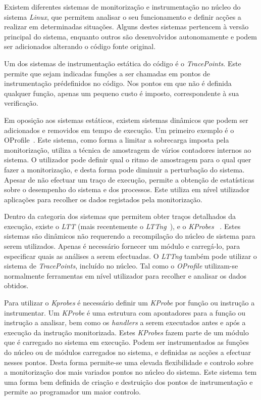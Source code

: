 \documentclass[a4paper]{llncs}
\newcommand{\td}[1]{\todo[inline]{#1}}
\begin{document}
Existem diferentes sistemas de monitorização e instrumentação no núcleo do sistema \textit{Linux}, que permitem analisar o seu funcionamento e definir acções a realizar em determinadas situações.
 Alguns destes sistemas pertencem à versão principal do sistema, enquanto outros são desenvolvidos autonomamente e podem ser adicionados alterando o código fonte original. 

Um dos sistemas de instrumentação estática do código é o \textit{TracePoints}. Este permite que sejam indicadas funções a ser chamadas em pontos de instrumentação prédefinidos no código. Nos pontos em que não é definida qualquer função, apenas um pequeno custo é imposto, correspondente à sua verificação. 

Em oposição aos sistemas estáticos, existem sistemas dinâmicos que podem  ser adicionados e removidos em tempo de execução. Um primeiro exemplo é o OProfile~\cite{oprofile}. 
Este sistema, como forma a limitar a sobrecarga imposta pela monitorização, utiliza a técnica de amostragem de vários contadores internos ao sistema. O utilizador pode definir qual o ritmo de amostragem para o qual quer fazer a monitorização, e desta forma pode diminuir a perturbação do sistema.
 Apesar de não efectuar um traço de execução, permite a obtenção de estatísticas sobre o desempenho do sistema e dos processos.
 Este utiliza em nível utilizador aplicações para recolher os dados registados pela monitorização.

Dentro da categoria dos sistemas que permitem obter traços detalhados da execução, existe o \textit{LTT} (mais recentemente o \textit{LTTng}~\cite{Mathieu2009}), e o \textit{KProbes} ~\cite{kernel_debug_printk_on_fly}. %
Estes sistemas são dinâmicos não requerendo a recompilação do núcleo de sistema para serem utilizados. Apenas é necessário fornecer um módulo  e carregá-lo, para  especificar quais as análises a serem efectuadas. O \textit{LTTng} também pode utilizar o sistema de \textit{TracePoints}, incluído no núcleo. Tal como o \textit{OProfile} utilizam-se normalmente ferramentas em nível utilizador para recolher e analisar os dados obtidos.

Para utilizar o \textit{Kprobes} é necessário definir um \textit{KProbe} por função ou instrução a instrumentar.
 Um \textit{KProbe} é uma estrutura com apontadores para a função ou instrução a analisar, bem como os \textit{handlers} a serem executados antes e após a execução da instrução monitorizada.
 Estes \textit{KProbes} fazem parte de um módulo que é carregado no sistema em execução.
Podem ser instrumentados as funções do núcleo ou de módulos carregados no sistema, e definidas as acções a efectuar nesses pontos. 
Desta forma permite-se uma elevada flexibilidade e controlo sobre a monitorização dos mais variados pontos no núcleo do sistema.
Este sistema tem uma forma bem definida de criação e destruição dos pontos de instrumentação e permite ao programador um maior controlo.
\end{document}
